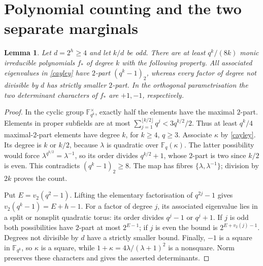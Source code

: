 \documentclass[11pt]{article}
\newtheorem{lemma}[theorem]{Lemma}
\newcommand{\F}{\mathbb F}
\begin{document}
\section{Polynomial counting and the two separate marginals}\label{countsec}
\begin{lemma}\label{bigfactor}
Let $d=2^h\ge4$ and let $k/d$ be odd. There are at least $q^k/(8k)$ monic irreducible polynomials $f_*$ of degree $k$ with the following property. All associated eigenvalues in \eqref{cayley} have $2$-part $(q^k-1)_2$, whereas every factor of degree not divisible by $d$ has strictly smaller $2$-part. In the orthogonal parametrisation the two determinant characters of $f_*$ are $+1,-1$, respectively.
\end{lemma}
\begin{proof}
In the cyclic group $\F_{q^k}^\times$, exactly half the elements have the maximal $2$-part. Elements in proper subfields are at most $\sum_{j=1}^{\lfloor k/2\rfloor}q^j<3q^{k/2}/2$. Thus at least $q^k/4$ maximal-$2$-part elements have degree $k$, for $k\ge4$, $q\ge3$. Associate $\kappa$ by \eqref{cayley}. Its degree is $k$ or $k/2$, because $\lambda$ is quadratic over $\F_q(\kappa)$. The latter possibility would force $\lambda^{q^{k/2}}=\lambda^{-1}$, so its order divides $q^{k/2}+1$, whose $2$-part is two since $k/2$ is even. This contradicts $(q^k-1)_2\ge8$. The map has fibres $\{\lambda,\lambda^{-1}\}$; division by $2k$ proves the count.

Put $E=v_2(q^2-1)$. Lifting the elementary factorisation of $q^{2j}-1$ gives $v_2(q^k-1)=E+h-1$. For a factor of degree $j$, its associated eigenvalue lies in a split or nonsplit quadratic torus: its order divides $q^j-1$ or $q^j+1$. If $j$ is odd both possibilities have $2$-part at most $2^{E-1}$; if $j$ is even the bound is $2^{E+v_2(j)-1}$. Degrees not divisible by $d$ have a strictly smaller bound. Finally, $-1$ is a square in $\F_{q^k}$, so $\kappa$ is a square, while $1+\kappa=4\lambda/(\lambda+1)^2$ is a nonsquare. Norm preserves these characters and gives the asserted determinants.
\end{proof}
\end{document}
